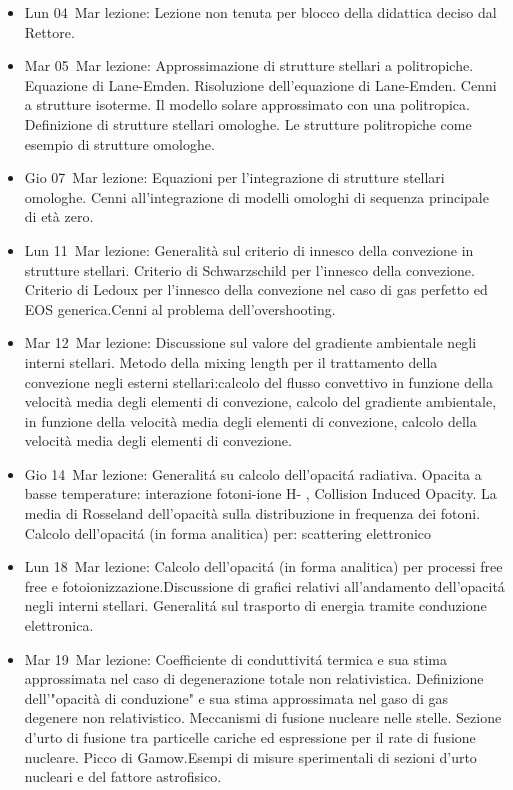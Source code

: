 \begin{itemize}
\item Lun 04 Mar lezione: Lezione non tenuta per blocco della didattica deciso dal Rettore. 
\item Mar 05 Mar lezione: Approssimazione di strutture stellari a politropiche. Equazione di Lane-Emden. Risoluzione dell'equazione di Lane-Emden. Cenni a strutture isoterme. Il modello solare approssimato con una politropica. Definizione di strutture stellari omologhe. Le strutture politropiche come esempio di strutture omologhe. 
\item Gio 07 Mar lezione: Equazioni per l'integrazione di strutture stellari omologhe. Cenni all'integrazione di modelli omologhi di sequenza principale di età zero. 
\item Lun 11 Mar lezione: Generalità sul criterio di innesco della convezione in strutture stellari. Criterio di Schwarzschild per l'innesco della convezione. Criterio di Ledoux per l'innesco della convezione nel caso di gas perfetto ed EOS generica.Cenni al problema dell'overshooting. 
\item Mar 12 Mar lezione: Discussione sul valore del gradiente ambientale negli interni stellari. Metodo della mixing length per il trattamento della convezione negli esterni stellari:calcolo del flusso convettivo in funzione della velocità media degli elementi di convezione, calcolo del gradiente ambientale, in funzione della velocità media degli elementi di convezione, calcolo della velocità media degli elementi di convezione. 
\item Gio 14 Mar lezione: Generalit\'a su calcolo dell'opacit\'a radiativa. Opacita a basse temperature: interazione fotoni-ione H- , Collision Induced Opacity. La media di Rosseland dell'opacità sulla distribuzione in frequenza dei fotoni. Calcolo dell'opacit\'a (in forma analitica) per: scattering elettronico 
\item Lun 18 Mar lezione: Calcolo dell'opacit\'a (in forma analitica) per processi free free e fotoionizzazione.Discussione di grafici relativi all'andamento dell'opacit\'a negli interni stellari. Generalit\'a sul trasporto di energia tramite conduzione elettronica. 
\item Mar 19 Mar lezione: Coefficiente di conduttivit\'a termica e sua stima approssimata nel caso di degenerazione totale non relativistica. Definizione dell'"opacità di conduzione" e sua stima approssimata nel gaso di gas degenere non relativistico. Meccanismi di fusione nucleare nelle stelle. Sezione d'urto di fusione tra particelle cariche ed espressione per il rate di fusione nucleare. Picco di Gamow.Esempi di misure sperimentali di sezioni d'urto nucleari e del fattore astrofisico. 

\end{itemize}

